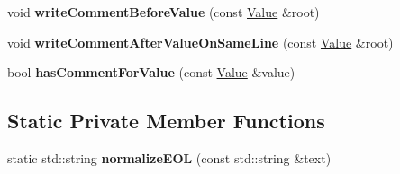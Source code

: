 \begin{DoxyCompactItemize}
\item 
\hypertarget{class_json_1_1_styled_writer_ad3452c48fabf968bf3693549331ec06e}{void {\bfseries write\-Comment\-Before\-Value} (const \hyperlink{class_json_1_1_value}{Value} \&root)}\label{class_json_1_1_styled_writer_ad3452c48fabf968bf3693549331ec06e}

\item 
\hypertarget{class_json_1_1_styled_writer_ab12b274c62822fc51ec4617c6be95139}{void {\bfseries write\-Comment\-After\-Value\-On\-Same\-Line} (const \hyperlink{class_json_1_1_value}{Value} \&root)}\label{class_json_1_1_styled_writer_ab12b274c62822fc51ec4617c6be95139}

\item 
\hypertarget{class_json_1_1_styled_writer_a37a806d010f708cb68556f2666f79bdf}{bool {\bfseries has\-Comment\-For\-Value} (const \hyperlink{class_json_1_1_value}{Value} \&value)}\label{class_json_1_1_styled_writer_a37a806d010f708cb68556f2666f79bdf}

\end{DoxyCompactItemize}
\subsection*{Static Private Member Functions}
\begin{DoxyCompactItemize}
\item 
\hypertarget{class_json_1_1_styled_writer_ae5ceeb6085815461518f17a4485af571}{static std\-::string {\bfseries normalize\-E\-O\-L} (const std\-::string \&text)}\label{class_json_1_1_styled_writer_ae5ceeb6085815461518f17a4485af571}

\end{DoxyCompactItemize}
